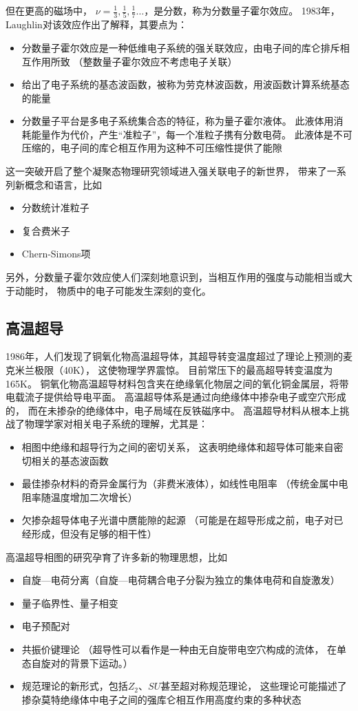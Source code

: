 \documentclass{article}
\begin{document}
但在更高的磁场中，
$\nu=\frac{1}{3},\frac{1}{5},\frac{1}{7}\dots$，是分数，称为分数量子霍尔效应。
1983年，Laughlin对该效应作出了解释，其要点为：
\begin{itemize}
    \item 分数量子霍尔效应是一种低维电子系统的强关联效应，由电子间的库仑排斥相互作用所致
     （整数量子霍尔效应不考虑电子关联）
    \item 给出了电子系统的基态波函数，被称为劳克林波函数，用波函数计算系统基态的能量
    \item 分数量子平台是多电子系统集合态的特征，称为量子霍尔液体。
    此液体用消耗能量作为代价，产生“准粒子”，每一个准粒子携有分数电荷。
    此液体是不可压缩的，电子间的库仑相互作用为这种不可压缩性提供了能隙
\end{itemize}
这一突破开启了整个凝聚态物理研究领域进入强关联电子的新世界，
带来了一系列新概念和语言，比如
\begin{itemize}
    \item 分数统计准粒子
    \item 复合费米子
    \item Chern-Simons项
\end{itemize}
另外，分数量子霍尔效应使人们深刻地意识到，当相互作用的强度与动能相当或大于动能时，
物质中的电子可能发生深刻的变化。

\subsection{高温超导}
1986年，人们发现了铜氧化物高温超导体，其超导转变温度超过了理论上预测的麦克米兰极限（40K），
这使物理学界震惊。
目前常压下的最高超导转变温度为165K。
铜氧化物高温超导材料包含夹在绝缘氧化物层之间的氧化铜金属层，将带电载流子提供给导电平面。
高温超导体系是通过向绝缘体中掺杂电子或空穴形成的，
而在未掺杂的绝缘体中，电子局域在反铁磁序中。
高温超导材料从根本上挑战了物理学家对相关电子系统的理解，尤其是：
\begin{itemize}
    \item 相图中绝缘和超导行为之间的密切关系，
    这表明绝缘体和超导体可能来自密切相关的基态波函数
    \item 最佳掺杂材料的奇异金属行为（非费米液体），如线性电阻率
    （传统金属中电阻率随温度增加二次增长）
    \item 欠掺杂超导体电子光谱中赝能隙的起源
    （可能是在超导形成之前，电子对已经形成，但没有足够的相干性）
 \end{itemize}

 高温超导相图的研究孕育了许多新的物理思想，比如
 \begin{itemize}
     \item 自旋---电荷分离（自旋---电荷耦合电子分裂为独立的集体电荷和自旋激发）
     \item 量子临界性、量子相变
     \item 电子预配对
     \item 共振价键理论
     （超导性可以看作是一种由无自旋带电空穴构成的流体，
     在单态自旋对的背景下运动。）
     \item 规范理论的新形式，包括$Z_2$、$SU$甚至超对称规范理论，
     这些理论可能描述了掺杂莫特绝缘体中电子之间的强库仑相互作用高度约束的多种状态
 \end{itemize}
\end{document}
